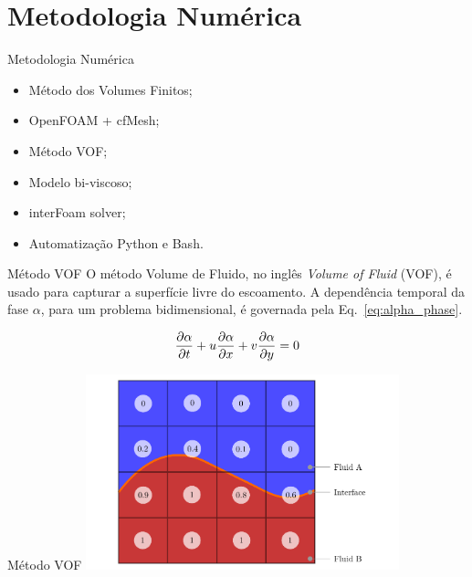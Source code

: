 \section{Metodologia Numérica}

\begin{frame}
    \begin{exampleblock}{Metodologia Numérica}
        \begin{itemize}
            \item Método dos Volumes Finitos;
            \item OpenFOAM + cfMesh;
            \item Método VOF;
            \item Modelo bi-viscoso;
            \item interFoam solver;
            \item Automatização Python e Bash.
        \end{itemize}
    \end{exampleblock}
\end{frame}

\begin{frame}{Método VOF}
    O método Volume de Fluido, no inglês \textit{Volume of Fluid} (VOF), é usado para capturar a superfície livre do escoamento. A dependência temporal da fase $\alpha$, para um problema bidimensional, é governada pela Eq.~\ref{eq:alpha_phase}.

    \begin{equation} \label{eq:alpha_phase}
        \frac{\partial \alpha}{\partial t} + u \frac{\partial \alpha}{\partial x} + v \frac{\partial \alpha}{\partial y} = 0
    \end{equation}

\end{frame}

\begin{frame}{Método VOF} 
    \centering
    \includegraphics[width=0.68\textwidth]{images/vof.pdf}
\end{frame}

